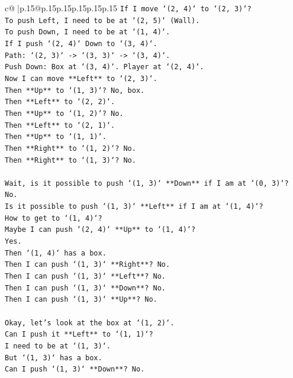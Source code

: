 \documentclass{article}
\begin{document}
{\begin{supertabular}{c@{$\;$}|p{.15\linewidth}@{}p{.15\linewidth}p{.15\linewidth}p{.15\linewidth}p{.15\linewidth}p{.15\linewidth}}
{{{\texttt{If I move `(2, 4)` to `(2, 3)`?} \\
\texttt{To push Left, I need to be at `(2, 5)` (Wall).} \\
\texttt{To push Down, I need to be at `(1, 4)`.} \\
\texttt{If I push `(2, 4)` Down to `(3, 4)`.} \\
\texttt{Path: `(2, 3)` {-}> `(3, 3)` {-}> `(3, 4)`.} \\
\texttt{Push Down: Box at `(3, 4)`. Player at `(2, 4)`.} \\
\texttt{Now I can move **Left** to `(2, 3)`.} \\
\texttt{Then **Up** to `(1, 3)`? No, box.} \\
\texttt{Then **Left** to `(2, 2)`.} \\
\texttt{Then **Up** to `(1, 2)`? No.} \\
\texttt{Then **Left** to `(2, 1)`.} \\
\texttt{Then **Up** to `(1, 1)`.} \\
\texttt{Then **Right** to `(1, 2)`? No.} \\
\texttt{Then **Right** to `(1, 3)`? No.} \\
\\ 
\texttt{Wait, is it possible to push `(1, 3)` **Down** if I am at `(0, 3)`? No.} \\
\texttt{Is it possible to push `(1, 3)` **Left** if I am at `(1, 4)`?} \\
\texttt{How to get to `(1, 4)`?} \\
\texttt{Maybe I can push `(2, 4)` **Up** to `(1, 4)`?} \\
\texttt{Yes.} \\
\texttt{Then `(1, 4)` has a box.} \\
\texttt{Then I can push `(1, 3)` **Right**? No.} \\
\texttt{Then I can push `(1, 3)` **Left**? No.} \\
\texttt{Then I can push `(1, 3)` **Down**? No.} \\
\texttt{Then I can push `(1, 3)` **Up**? No.} \\
\\ 
\texttt{Okay, let's look at the box at `(1, 2)`.} \\
\texttt{Can I push it **Left** to `(1, 1)`?} \\
\texttt{I need to be at `(1, 3)`.} \\
\texttt{But `(1, 3)` has a box.} \\
\texttt{Can I push `(1, 3)` **Down**? No.} \\
}}}
\end{supertabular}}
\end{document}
